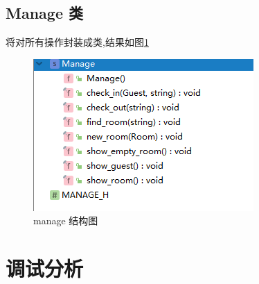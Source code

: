 \documentclass[UTF8]{ctexart}
\begin{document}
  \subsection{Manage 类}
    将对所有操作封装成类,结果如图\ref{fig:structure_manage}
    \begin{figure}[H]
        \centering
        \includegraphics[scale = 1]{structure_manage}
        \caption{manage 结构图}
        \label{fig:structure_manage}
      \end{figure}
\section{调试分析}
\end{document}

